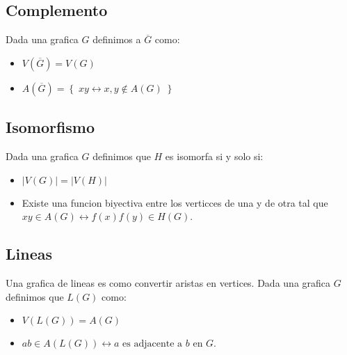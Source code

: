 \documentclass[12pt, fleqn]{report}                             %
\newcommand \Over               {\overline}                     %
\theoremstyle{break}                                            %
\newcommand \lIff    {\leftrightarrow}                          %
\newcommand{\Set}[1]            {\left\{ \; #1 \; \right\}}     %
\begin{document}
            \subsection{Complemento}

                Dada una grafica $G$ definimos a $\Over{G}$ como:
                \begin{itemize}
                    \item $V(\Over{G}) = V (G)$
                    \item $A(\Over{G}) = \Set{xy \lIff x, y \not \in A(G)}$
                \end{itemize}

            \subsection{Isomorfismo}

                Dada una grafica $G$ definimos que $H$ es isomorfa si y solo si:
                \begin{itemize}
                    \item $|V(G)| = |V(H)|$
                    \item Existe una funcion biyectiva entre los verticces de una y de otra tal que
                    $xy \in A(G) \lIff f(x)f(y) \in H(G)$.
                \end{itemize}


            \subsection{Lineas}
            
                Una grafica de lineas es como convertir aristas en vertices.
                Dada una grafica $G$ definimos que $L(G)$ como:
                \begin{itemize}
                    \item $V(L(G)) = A(G)$
                    \item $ab \in A(L(G)) \lIff a \text{ es adjacente a } b \text{ en } G$.
                \end{itemize}
\end{document}

